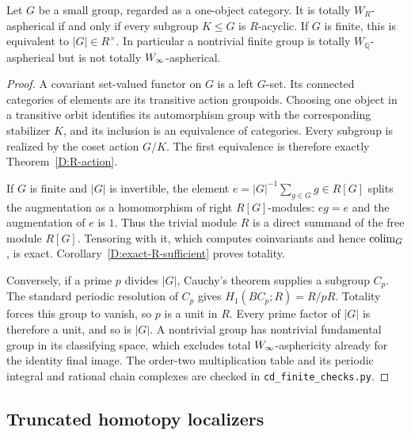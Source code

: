 \begin{proposition}\label{D:group-criterion}
Let $G$ be a small group, regarded as a one-object category. It is totally $W_R$-aspherical if and only if every subgroup $K\leq G$ is $R$-acyclic. If $G$ is finite, this is equivalent to $|G|\in R^\times$. In particular a nontrivial finite group is totally $W_{\mathbb Q}$-aspherical but is not totally $W_{\infty}$-aspherical.
\end{proposition}
\begin{proof}
A covariant set-valued functor on $G$ is a left $G$-set. Its connected categories of elements are its transitive action groupoids. Choosing one object in a transitive orbit identifies its automorphism group with the corresponding stabilizer $K$, and its inclusion is an equivalence of categories. Every subgroup is realized by the coset action $G/K$. The first equivalence is therefore exactly Theorem~\ref{D:R-action}.

If $G$ is finite and $|G|$ is invertible, the element $e=|G|^{-1}\sum_{g\in G}g\in R[G]$ splits the augmentation as a homomorphism of right $R[G]$-modules: $eg=e$ and the augmentation of $e$ is $1$. Thus the trivial module $R$ is a direct summand of the free module $R[G]$. Tensoring with it, which computes coinvariants and hence $\operatorname{colim}_G$, is exact. Corollary~\ref{D:exact-R-sufficient} proves totality.

Conversely, if a prime $p$ divides $|G|$, Cauchy's theorem supplies a subgroup $C_p$. The standard periodic resolution of $C_p$ gives
$H_1(BC_p;R)=R/pR$. Totality forces this group to vanish, so $p$ is a unit in $R$. Every prime factor of $|G|$ is therefore a unit, and so is $|G|$. A nontrivial group has nontrivial fundamental group in its classifying space, which excludes total $W_{\infty}$-asphericity already for the identity final image. The order-two multiplication table and its periodic integral and rational chain complexes are checked in \texttt{cd\_finite\_checks.py}.
\end{proof}

\subsection{Truncated homotopy localizers}

